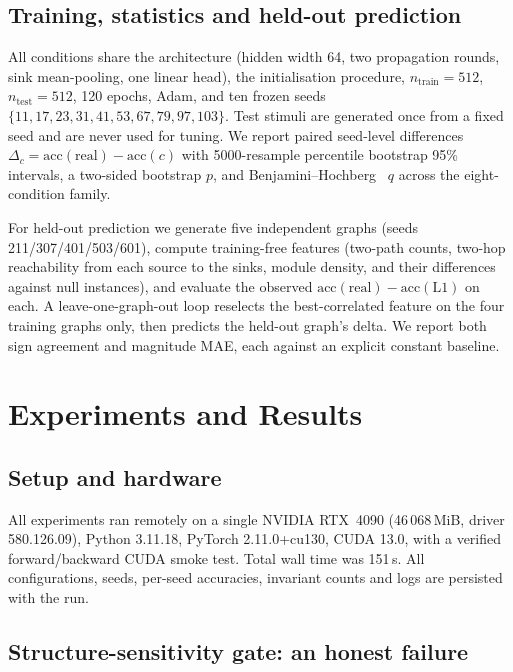 \documentclass[10pt,twocolumn,letterpaper]{article}
\begin{document}
\subsection{Training, statistics and held-out prediction}
\label{sec:protocol}

All conditions share the architecture (hidden width 64, two propagation
rounds, sink mean-pooling, one linear head), the initialisation procedure,
$n_{\text{train}}=512$, $n_{\text{test}}=512$, 120 epochs, Adam, and ten frozen
seeds $\{11,17,23,31,41,53,67,79,97,103\}$. Test stimuli are generated once
from a fixed seed and are never used for tuning. We report paired seed-level
differences $\Delta_c = \mathrm{acc}(\text{real}) - \mathrm{acc}(c)$ with
5000-resample percentile bootstrap 95\% intervals, a two-sided bootstrap $p$,
and Benjamini--Hochberg~\cite{benjamini1995} $q$ across the eight-condition family.

For held-out prediction we generate five independent graphs (seeds
211/307/401/503/601), compute training-free features (two-path counts,
two-hop reachability from each source to the sinks, module density, and their
differences against null instances), and evaluate the observed
$\mathrm{acc}(\text{real})-\mathrm{acc}(\text{L1})$ on each. A
leave-one-graph-out loop reselects the best-correlated feature on the four
training graphs only, then predicts the held-out graph's delta. We report both
sign agreement and magnitude MAE, each against an explicit constant baseline.

\section{Experiments and Results}
\label{sec:exp}

\subsection{Setup and hardware}
\label{sec:setup}

All experiments ran remotely on a single NVIDIA RTX~4090 (46\,068\,MiB,
driver 580.126.09), Python 3.11.18, PyTorch 2.11.0+cu130, CUDA 13.0, with a
verified forward/backward CUDA smoke test. Total wall time was 151\,s. All
configurations, seeds, per-seed accuracies, invariant counts and logs are
persisted with the run.

\subsection{Structure-sensitivity gate: an honest failure}
\label{sec:gate}
\end{document}
